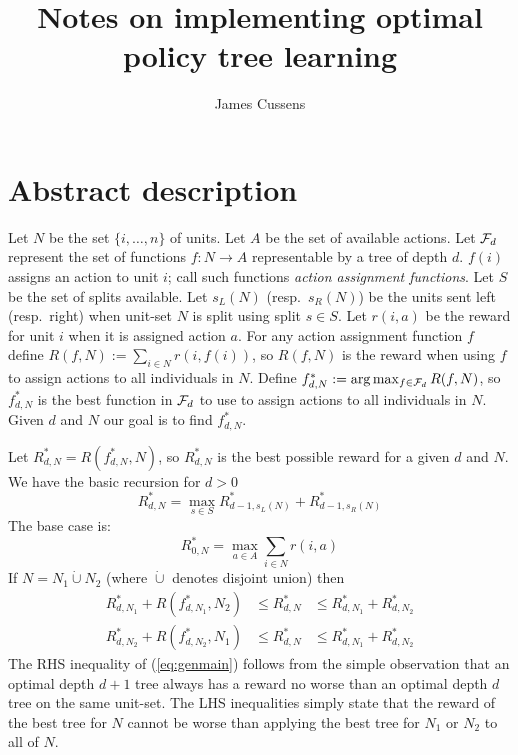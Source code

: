 \documentclass{article}
\title{Notes on implementing optimal policy tree learning}
\author{James Cussens}
\begin{document}
\maketitle

\section{Abstract description}
\label{sec:abs}

Let $N$ be the set $\{i,\dots,n\}$ of units. Let $A$ be the set
of available actions.  Let ${\cal F}_d$ represent the set of functions
$f:N \rightarrow A$ representable by a tree of depth $d$. $f(i)$
assigns an action to unit $i$; call such functions \emph{action
  assignment functions}. Let $S$ be the set of splits available. Let
$s_{L}(N)$ (resp.\ $s_{R}(N)$) be the units sent left (resp.\ right)
when unit-set $N$ is split using split $s \in S$. Let $r(i,a)$ be the
reward for unit $i$ when it is assigned action $a$. For any
action assignment function $f$ define
$R(f,N) := \sum_{i \in N} r(i,f(i))$, so $R(f,N)$ is the reward when
using $f$ to assign actions to all individuals in $N$. Define
$f^{*}_{d,N} := \arg\max_{f \in {\cal F}_d} R(f,N)$, so $f^{*}_{d,N}$
is the best function in ${\cal F}_d$ to use to assign actions to all
individuals in $N$. Given $d$ and $N$ our goal is to find $f^{*}_{d,N}$.

Let $R^{*}_{d,N} = R(f^{*}_{d,N},N)$, so $R^{*}_{d,N}$ is the best
possible reward for a given $d$ and $N$. We have the basic recursion
for $d>0$
\begin{equation}
  \label{eq:basicrecursion}
  R^{*}_{d,N}
  = \max_{s \in S}   R^{*}_{d-1,s_{L}(N)} + R^{*}_{d-1,s_{R}(N)} 
\end{equation}
The base case is:
\begin{equation}
  \label{eq:base}
    R^{*}_{0,N} =  \max_{a \in A} \sum_{i \in N}  r(i,a)
\end{equation}
If $N = N_{1} \dot\cup N_{2}$ (where $\dot\cup$ denotes disjoint
union) then
\begin{eqnarray}
  \label{eq:genmain}
 R^{*}_{d,N_{1}} + R(f^{*}_{d,N_{1}},N_{2})  & \leq R^{*}_{d,N}  & \leq  R^{*}_{d,N_{1}} + R^{*}_{d,N_{2}} \\
 R^{*}_{d,N_{2}} + R(f^{*}_{d,N_{2}},N_{1})  & \leq R^{*}_{d,N}  & \leq  R^{*}_{d,N_{1}} + R^{*}_{d,N_{2}} 
\end{eqnarray}
The RHS inequality of (\ref{eq:genmain}) follows from the simple
observation that an optimal depth $d+1$ tree always has a reward no
worse than an optimal depth $d$ tree on the same unit-set. The LHS
inequalities simply state that the reward of the best tree for $N$
cannot be worse than applying the best tree for $N_{1}$ or $N_2$ to
all of $N$.
\end{document}
